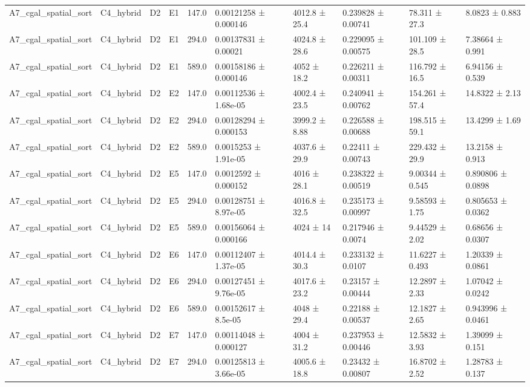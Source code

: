 \begin{table}
\begin{tabular}{llllllllll}
A7\_cgal\_spatial\_sort & C4\_hybrid & D2 & E1 & 147.0 & 0.00121258 ± 0.000146 & 4012.8 ± 25.4 & 0.239828 ± 0.00741 & 78.311 ± 27.3 & 8.0823 ± 0.883 \\
A7\_cgal\_spatial\_sort & C4\_hybrid & D2 & E1 & 294.0 & 0.00137831 ± 0.00021 & 4024.8 ± 28.6 & 0.229095 ± 0.00575 & 101.109 ± 28.5 & 7.38664 ± 0.991 \\
A7\_cgal\_spatial\_sort & C4\_hybrid & D2 & E1 & 589.0 & 0.00158186 ± 0.000146 & 4052 ± 18.2 & 0.226211 ± 0.00311 & 116.792 ± 16.5 & 6.94156 ± 0.539 \\
A7\_cgal\_spatial\_sort & C4\_hybrid & D2 & E2 & 147.0 & 0.00112536 ± 1.68e-05 & 4002.4 ± 23.5 & 0.240941 ± 0.00762 & 154.261 ± 57.4 & 14.8322 ± 2.13 \\
A7\_cgal\_spatial\_sort & C4\_hybrid & D2 & E2 & 294.0 & 0.00128294 ± 0.000153 & 3999.2 ± 8.88 & 0.226588 ± 0.00688 & 198.515 ± 59.1 & 13.4299 ± 1.69 \\
A7\_cgal\_spatial\_sort & C4\_hybrid & D2 & E2 & 589.0 & 0.0015253 ± 1.91e-05 & 4037.6 ± 29.9 & 0.22411 ± 0.00743 & 229.432 ± 29.9 & 13.2158 ± 0.913 \\
A7\_cgal\_spatial\_sort & C4\_hybrid & D2 & E5 & 147.0 & 0.0012592 ± 0.000152 & 4016 ± 28.1 & 0.238322 ± 0.00519 & 9.00344 ± 0.545 & 0.890806 ± 0.0898 \\
A7\_cgal\_spatial\_sort & C4\_hybrid & D2 & E5 & 294.0 & 0.00128751 ± 8.97e-05 & 4016.8 ± 32.5 & 0.235173 ± 0.00997 & 9.58593 ± 1.75 & 0.805653 ± 0.0362 \\
A7\_cgal\_spatial\_sort & C4\_hybrid & D2 & E5 & 589.0 & 0.00156064 ± 0.000166 & 4024 ± 14 & 0.217946 ± 0.0074 & 9.44529 ± 2.02 & 0.68656 ± 0.0307 \\
A7\_cgal\_spatial\_sort & C4\_hybrid & D2 & E6 & 147.0 & 0.00112407 ± 1.37e-05 & 4014.4 ± 30.3 & 0.233132 ± 0.0107 & 11.6227 ± 0.493 & 1.20339 ± 0.0861 \\
A7\_cgal\_spatial\_sort & C4\_hybrid & D2 & E6 & 294.0 & 0.00127451 ± 9.76e-05 & 4017.6 ± 23.2 & 0.23157 ± 0.00444 & 12.2897 ± 2.33 & 1.07042 ± 0.0242 \\
A7\_cgal\_spatial\_sort & C4\_hybrid & D2 & E6 & 589.0 & 0.00152617 ± 8.5e-05 & 4048 ± 29.4 & 0.22188 ± 0.00537 & 12.1827 ± 2.65 & 0.943996 ± 0.0461 \\
A7\_cgal\_spatial\_sort & C4\_hybrid & D2 & E7 & 147.0 & 0.00114048 ± 0.000127 & 4004 ± 31.2 & 0.237953 ± 0.00446 & 12.5832 ± 3.93 & 1.39099 ± 0.151 \\
A7\_cgal\_spatial\_sort & C4\_hybrid & D2 & E7 & 294.0 & 0.00125813 ± 3.66e-05 & 4005.6 ± 18.8 & 0.23432 ± 0.00807 & 16.8702 ± 2.52 & 1.28783 ± 0.137 \\

\end{tabular}
\end{table}
